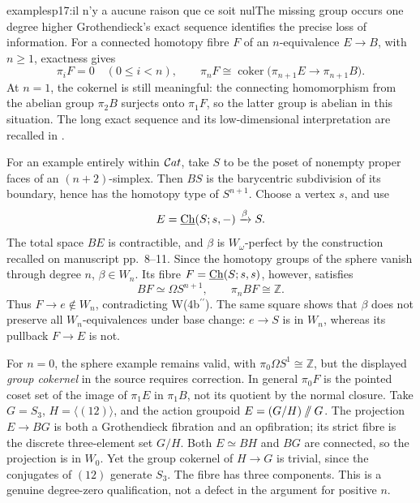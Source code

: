\begin{dcomment}{examples}{p17:il n'y a aucune raison que ce soit nul}{The missing group occurs one degree higher}
Grothendieck's exact sequence identifies the precise loss of information. For a connected homotopy fibre \(F\) of an \(n\)-equivalence \(E\to B\), with \(n\geq1\), exactness gives
\[
 \pi_iF=0\quad(0\leq i<n),\qquad
 \pi_nF\cong
 \operatorname{coker}\bigl(\pi_{n+1}E\to\pi_{n+1}B\bigr).
\]
At \(n=1\), the cokernel is still meaningful: the connecting homomorphism from the abelian group \(\pi_2B\) surjects onto \(\pi_1F\), so the latter group is abelian in this situation. The long exact sequence and its low-dimensional interpretation are recalled in \citet[Theorem~4.41]{Hatcher2002}.

For an example entirely within \(\mathcal{C}at\), take \(S\) to be the poset of nonempty proper faces of an \((n+2)\)-simplex. Then \(BS\) is the barycentric subdivision of its boundary, hence has the homotopy type of \(S^{n+1}\). Choose a vertex \(s\), and use
\[
 E=\underline{\mathrm{Ch}}(S;s,-)\xrightarrow{\beta}S .
\]
The total space \(BE\) is contractible, and \(\beta\) is \(W_\omega\)-perfect by the construction recalled on manuscript pp.~8--11. Since the homotopy groups of the sphere vanish through degree \(n\), \(\beta\in W_n\). Its fibre \(F=\underline{\mathrm{Ch}}(S;s,s)\), however, satisfies
\[
 BF\simeq\Omega S^{n+1},\qquad \pi_n BF\cong\mathbb Z.
\]
Thus \(F\to e\notin W_n\), contradicting W(4b\(^{\prime\prime}\)). The same square shows that \(\beta\) does not preserve all \(W_n\)-equivalences under base change: \(e\to S\) is in \(W_n\), whereas its pullback \(F\to E\) is not.

For \(n=0\), the sphere example remains valid, with \(\pi_0\Omega S^1\cong\mathbb Z\), but the displayed \emph{group cokernel} in the source requires correction. In general \(\pi_0F\) is the pointed coset set of the image of \(\pi_1E\) in \(\pi_1B\), not its quotient by the normal closure. Take \(G=S_3\), \(H=\langle(12)\rangle\), and the action groupoid \(E=(G/H)\mathbin{/\mkern-6mu/}G\). The projection \(E\to BG\) is both a Grothendieck fibration and an opfibration; its strict fibre is the discrete three-element set \(G/H\). Both \(E\simeq BH\) and \(BG\) are connected, so the projection is in \(W_0\). Yet the group cokernel of \(H\to G\) is trivial, since the conjugates of \((12)\) generate \(S_3\). The fibre has three components. This is a genuine degree-zero qualification, not a defect in the argument for positive \(n\).
\end{dcomment}


